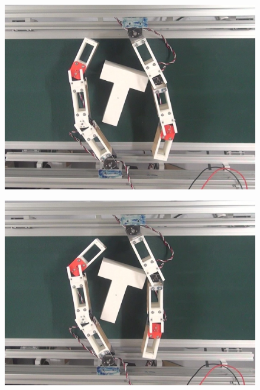 \documentclass[a4paper,twoside,12pt,papersize, dvipdfmx]{iirthesis}
\begin{document}
\begin{figure}[b]
\centering
\begin{minipage}{0.249\hsize}
\centering
\includegraphics[width=0.98\hsize]{fig/4-manipulation-result/TShape/2-1.jpg}
\subcaption{}\label{}
\end{minipage}\hfill
\begin{minipage}{0.249\hsize}
\centering
\includegraphics[width=0.98\hsize]{fig/4-manipulation-result/TShape/2-2.jpg}
\subcaption{}\label{}
\end{minipage}\hfill
\begin{minipage}{0.249\hsize}
\centering

\end{minipage}
\end{figure}
\end{document}
